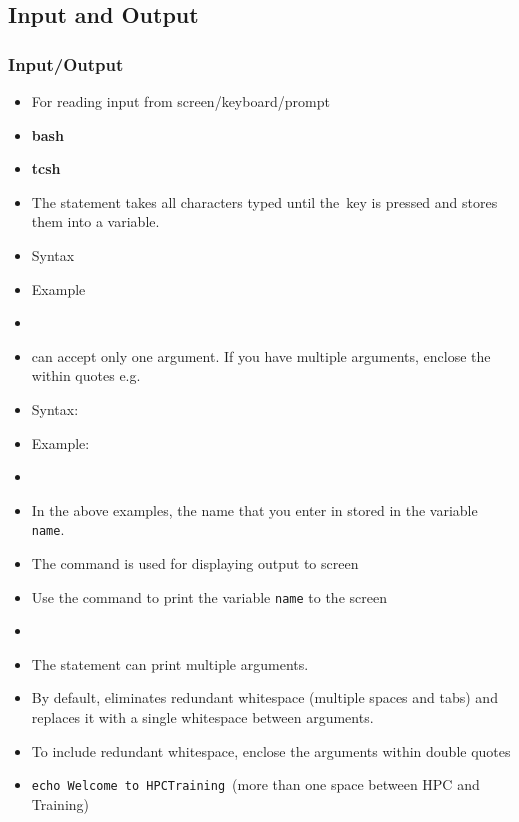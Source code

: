 \documentclass[10pt,t]{beamer}
\begin{document}
\subsection{Input and Output}
\begin{frame}
  \frametitle{Input/Output}
  \begin{itemize}
    \item For reading input from screen/keyboard/prompt
    \item[]\textbf{bash} 
    \item[]\textbf{tcsh} \Verblubrown{\$<}
    \item The  statement takes all characters typed until the \Enter \,key is pressed and stores them into a variable.
    \item[]Syntax 
    \item[]Example 
    \item[] 
    \item \Verblubrown{\$<} can accept only one argument. If you have multiple arguments, enclose the \Verblubrown{\$<} within quotes e.g. 
    \item[]Syntax: 
    \item[]Example: 
    \item[] 
    \item In the above examples, the name that you enter in stored in the variable \texttt{name}.
    \newpage
    \item The command  is used for displaying output to screen 
    \item Use the  command to print the variable \texttt{name} to the screen
    \item[] 
    \item The  statement can print multiple arguments. 
    \item By default,  eliminates redundant whitespace (multiple spaces and tabs) and replaces it with a single whitespace between arguments. 
    \item To include redundant whitespace, enclose the arguments within double quotes
    \item[] \texttt{echo Welcome to HPC\quad\quad Training}\enter\, (more than one space between HPC and Training)

\end{itemize}
\end{frame}
\end{document}
